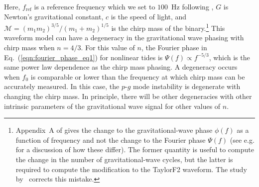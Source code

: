 Here, $f_\mathrm{ref}$ is a reference frequency which we set to $100$~Hz following \cite{Essick:2016tkn}, $G$ is Newton's gravitational constant, $c$ is the speed of light, and $\mathcal{M} = (m_1 m_2)^{3/5}/(m_1+m_2)^{1/5}$ is the chirp mass of the binary.\footnote{Appendix~A of \cite{Essick:2016tkn} gives the change to the gravitational-wave phase $\phi(f)$ as a function of frequency and not the change to the Fourier phase $\Psi(f)$ (see e.g. \cite{Lindblom:2008cm} for a discussion of how these differ). The former quantity is useful to compute the change in the number of gravitational-wave cycles, but the latter is required to compute the modification to the TaylorF2 waveform. The study by~\cite{abbott2019constraining} corrects this mistake.} This waveform model can have a degeneracy in the gravitational wave phasing with chirp mass when $n = 4/3$. For this value of $n$, the Fourier phase in Eq.~(\ref{eqn:fourier_phase_eq1}) for nonlinear tides is $\Psi(f) \propto f^{-5/3}$, which is the same power law dependence as the chirp mass phasing. A degeneracy occurs when $f_0$ is comparable or lower than the frequency at which chirp mass can be accurately measured. In this case, the $p$-$g$ mode instability is degenerate with changing the chirp mass. In principle, there will be other degeneracies with other intrinsic parameters of the gravitational wave signal for other values of $n$.

